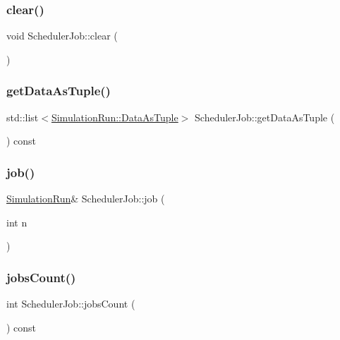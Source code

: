 \subsubsection{\texorpdfstring{clear()}{clear()}}
{\footnotesize\ttfamily void Scheduler\+Job\+::clear (\begin{DoxyParamCaption}{ }\end{DoxyParamCaption})}

\mbox{\label{class_scheduler_job_a46a05e5eddd572c6848483bf4ee134e5}} 
\subsubsection{\texorpdfstring{getDataAsTuple()}{getDataAsTuple()}}
{\footnotesize\ttfamily std\+::list$<$\mbox{\hyperlink{class_simulation_run_a0088973963e3846e2543a2b14c686d7b}{Simulation\+Run\+::\+Data\+As\+Tuple}}$>$ Scheduler\+Job\+::get\+Data\+As\+Tuple (\begin{DoxyParamCaption}{ }\end{DoxyParamCaption}) const\hspace{0.3cm}{\ttfamily [inline]}}

\mbox{\label{class_scheduler_job_aeeb381d0346db271d4b142dc33752437}} 
\subsubsection{\texorpdfstring{job()}{job()}}
{\footnotesize\ttfamily \mbox{\hyperlink{class_simulation_run}{Simulation\+Run}}\& Scheduler\+Job\+::job (\begin{DoxyParamCaption}\item[{int}]{n }\end{DoxyParamCaption})\hspace{0.3cm}{\ttfamily [inline]}}

\mbox{\label{class_scheduler_job_ac6251a7fc64485ea4dd487fd3339dcaa}} 
\subsubsection{\texorpdfstring{jobsCount()}{jobsCount()}}
{\footnotesize\ttfamily int Scheduler\+Job\+::jobs\+Count (\begin{DoxyParamCaption}{ }\end{DoxyParamCaption}) const\hspace{0.3cm}{\ttfamily [inline]}}

